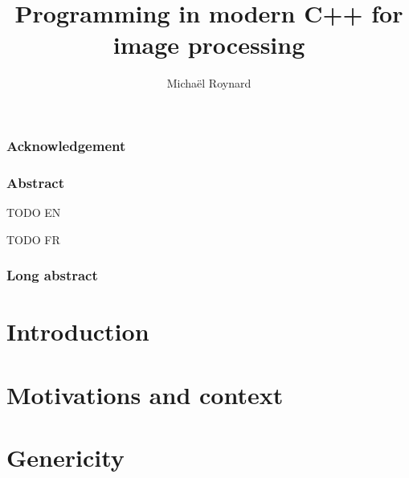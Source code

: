 \documentclass[11pt]{book}
\begin{document}
%
\title{Programming in modern C++ for image processing}


\author{Michaël Roynard}



\maketitle

\section{Acknowledgement}
\label{sec.acknowledgement}


\section{Abstract}
\label{sec.abstract}
  TODO EN

  TODO FR

\section{Long abstract}
\label{sec.long_abstract}


\tableofcontents
\label{table.of.contents}

\listoffigures
\label{list.of.figures}

\listoftables
\label{list.of.tables}

\cleardoublepage


\part{Introduction}
\label{part.introduction}



\cleardoublepage


\part{Motivations and context}
\label{part.motivations_and_context}



\cleardoublepage


\part{Genericity}
\label{part.genericity}
\end{document}
